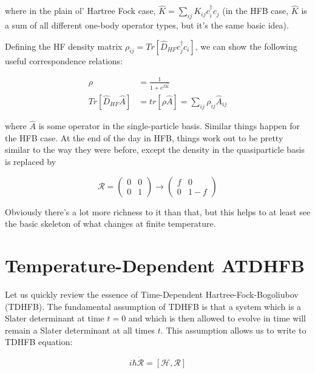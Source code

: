 \noindent where in the plain ol' Hartree Fock case, $\hat{K} = \sum_{ij}K_{ij}c_i^\dagger c_j$ (in the HFB case, $\hat{K}$ is a sum of all different one-body operator types, but it's the same basic idea).

Defining the HF density matrix $\rho_{ij}=Tr\left[\hat{D}_{HF}c_j^\dagger c_i\right]$, we can show the following useful correspondence relations:

\begin{align*}
\rho &= \frac{1}{1+e^{\beta\hat{K}}} \\
Tr\left[\hat{D}_{HF}\hat{A}\right] &= tr\left[\rho\hat{A}\right] = \sum_{ij}\rho_{ij}\hat{A}_{ij}
\end{align*}

\noindent where $\hat{A}$ is some operator in the single-particle basis. Similar things happen for the HFB case. At the end of the day in HFB, things work out to be pretty similar to the way they were before, except the density in the quasiparticle basis is replaced by

\begin{equation*}
\mathcal{R} =
\left(\begin{array}{cc}
0 & 0 \\
0 & 1
\end{array}\right)
\rightarrow
\left(\begin{array}{cc}
f & 0 \\
0 & 1-f
\end{array}\right)
\end{equation*}

\noindent Obviously there's a lot more richness to it than that, but this helps to at least see the basic skeleton of what changes at finite temperature.

\section{Temperature-Dependent ATDHFB}

Let us quickly review the essence of Time-Dependent Hartree-Fock-Bogoliubov (TDHFB). The fundamental assumption of TDHFB is that a system which is a Slater determinant at time $t=0$ and which is then allowed to evolve in time will remain a Slater determinant at all times $t$. This assumption allows us to write to TDHFB equation:

\begin{equation*}
i\hbar \mathcal{\dot{R}} = \left[\mathcal{H},\mathcal{R}\right]
\end{equation*}

